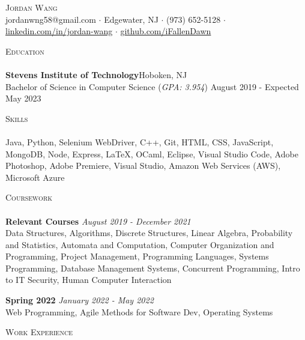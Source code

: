 \documentclass[10pt]{article}
\newcommand{\lineunder} {
    \vspace*{-8pt} \\
    \hspace*{-18pt} \hrulefill \\
}
\newcommand{\header} [1] {
    {\hspace*{-18pt}\vspace*{6pt} \textsc{#1}}
    \vspace*{-6pt} \lineunder
}
\begin{document}
\vspace*{-40pt}

    

\vspace*{2pt}
\begin{center}
	{\Huge \scshape {Jordan Wang}}\\
	\vspace{2mm}
	jordanwng58@gmail.com $\cdot$ Edgewater, NJ $\cdot$ (973) 652-5128 $\cdot$ \href{https://www.linkedin.com/in/jordan-wang/}{linkedin.com/in/jordan-wang} $\cdot$ \href{https://github.com/iFallenDawn}{github.com/iFallenDawn} \\
\end{center}
\header{Education}
\textbf{Stevens Institute of Technology}\hfill Hoboken, NJ\\
Bachelor of Science in Computer Science (\textit{GPA: 3.954}) \hfill August 2019 - Expected May 2023\\
\vspace{2mm}

\header{Skills}
	Java, Python, Selenium WebDriver, C++, Git, HTML, CSS, JavaScript, MongoDB, Node, Express, \LaTeX, OCaml, Eclipse, Visual Studio Code, Adobe Photoshop, Adobe Premiere, Visual Studio, Amazon Web Services (AWS), Microsoft Azure                    \\
\vspace{2mm}

\header{Coursework}
{\textbf{Relevant Courses}} {\sl August 2019 - December 2021} \hfill 
\\
Data Structures, Algorithms, Discrete Structures, Linear Algebra, Probability and Statistics, Automata and Computation, Computer Organization and Programming,  Project Management, Programming Languages, Systems Programming, Database Management Systems, Concurrent Programming, Intro to IT Security, Human Computer Interaction\\
\vspace*{2mm}

{\textbf{Spring 2022}} {\sl January 2022 - May 2022} \hfill 
\\
Web Programming, Agile Methods for Software Dev, Operating Systems\\
\vspace*{2mm}

\header{Work Experience}
\vspace{1mm}
\end{document}
